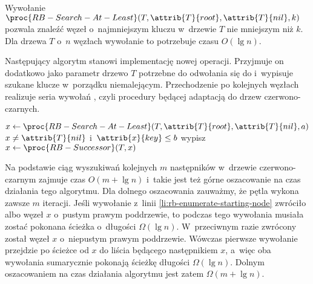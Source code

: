 Wywołanie $\proc{RB-Search-At-Least}(T,\attrib{T}{root},\attrib{T}{nil},k)$ pozwala znaleźć węzeł o~najmniejszym kluczu w~drzewie $T$ nie mniejszym niż $k$.
Dla drzewa $T$ o~$n$ węzłach wywołanie to potrzebuje czasu $O(\lg n)$.

Następujący algorytm stanowi implementację nowej operacji.
Przyjmuje on dodatkowo jako parametr drzewo $T$ potrzebne do odwołania się do  i~wypisuje szukane klucze w~porządku niemalejącym.
Przechodzenie po kolejnych węzłach realizuje seria wywołań , czyli procedury będącej adaptacją  do drzew czerwono-czarnych.
\begin{codebox}
\li $x\gets\proc{RB-Search-At-Least}(T,\attrib{T}{root},\attrib{T}{nil},a)$ \label{li:rb-enumerate-starting-node}
\li	\While $x\ne\attrib{T}{nil}$ i~$\attrib{x}{key}\le b$
\li		\Do wypisz  \label{li:rb-enumerate-print}
\li			$x\gets\proc{RB-Successor}(T,x)$
		\End
\end{codebox}

Na podstawie  ciąg wyszukiwań kolejnych $m$ następników w~drzewie czerwono-czarnym zajmuje czas $O(m+\lg n)$ i~takie jest też górne oszacowanie na czas działania tego algorytmu.
Dla dolnego oszacowania zauważmy, że pętla  wykona zawsze $m$ iteracji.
Jeśli wywołanie z~linii \ref{li:rb-enumerate-starting-node} zwróciło  albo węzeł $x$ o~pustym prawym poddrzewie, to podczas tego wywołania musiała zostać pokonana ścieżka o~długości $\Omega(\lg n)$.
W~przeciwnym razie zwrócony został węzeł $x$ o~niepustym prawym poddrzewie.
Wówczas pierwsze wywołanie  przejdzie po ścieżce od $x$ do liścia będącego następnikiem $x$, a~więc oba wywołania sumarycznie pokonają ścieżkę długości $\Omega(\lg n)$.
Dolnym oszacowaniem na czas działania algorytmu jest zatem $\Omega(m+\lg n)$.
